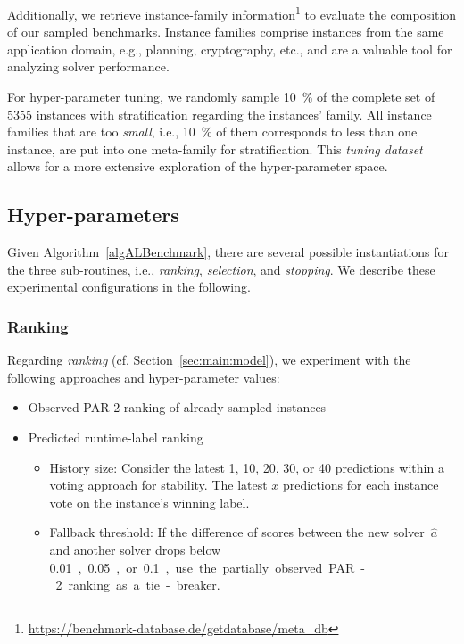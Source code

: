 \documentclass[sn-basic, Numbered]{sn-jnl} %
\begin{document}
Additionally, we retrieve instance-family information\footnote{\url{https://benchmark-database.de/getdatabase/meta_db}} to evaluate the composition of our sampled benchmarks.
Instance families comprise instances from the same application domain, e.g., planning, cryptography, etc., and are a valuable tool for analyzing solver performance.

For hyper-parameter tuning, we randomly sample \SI{10}{\%} of the complete set of 5355 instances with stratification regarding the instances' family.
All instance families that are too \emph{small}, i.e., \SI{10}{\%} of them corresponds to less than one instance, are put into one meta-family for stratification.
This \emph{tuning dataset} allows for a more extensive exploration of the hyper-parameter space.

\subsection{Hyper-parameters}
\label{sec:exdesign:hyper}

Given Algorithm~\ref{algALBenchmark}, there are several possible instantiations for the three sub-routines, i.e., \emph{ranking}, \emph{selection}, and \emph{stopping}.
We describe these experimental configurations in the following.

\subsubsection{Ranking}

Regarding \emph{ranking} (cf. Section~\ref{sec:main:model}), we experiment with the following approaches and hyper-parameter values:

\begin{itemize}
  \item Observed PAR-2 ranking of already sampled instances
  \item Predicted runtime-label ranking
  \begin{itemize}
    \item
    History size: Consider the latest 1, 10, 20, 30, or 40 predictions within a voting approach for stability.
    The latest $x$ predictions for each instance vote on the instance's winning label.
    \item
    Fallback threshold: If the difference of scores between the new solver~$\hat{a}$ and another solver drops below \SI{0.01}, \SI{0.05}, or \SI{0.1}, use the partially observed PAR-2 ranking as a tie-breaker.
  \end{itemize}
\end{itemize}
\end{document}

